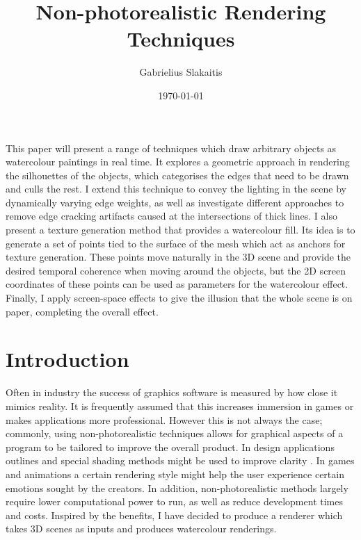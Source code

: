 \documentclass[a4paper, 12pt]{article}
\begin{document}
\title{Non-photorealistic Rendering Techniques}
\author{Gabrielius Slakaitis}
\date{\today}
\maketitle

\newpage


This paper will present a range of techniques which draw arbitrary objects as watercolour paintings in real time. It explores a geometric approach in rendering the silhouettes of the objects, which categorises the edges that need to be drawn and culls the rest. I extend this technique to convey the lighting in the scene by dynamically varying edge weights, as well as investigate different approaches to remove edge cracking artifacts caused at the intersections of thick lines. I also present a texture generation method that provides a watercolour fill. Its idea is to generate a set of points tied to the surface of the mesh which act as anchors for texture generation. These points move naturally in the 3D scene and provide the desired temporal coherence when moving around the objects, but the 2D screen coordinates of these points can be used as parameters for the watercolour effect. Finally, I apply screen-space effects to give the illusion that the whole scene is on paper, completing the overall effect.



\section{Introduction}

Often in industry the success of graphics software is measured by how close it mimics reality. It is frequently assumed that this increases immersion in games or makes applications more professional. However this is not always the case; commonly, using non-photorealistic techniques allows for graphical aspects of a program to be tailored to improve the overall product. In design applications outlines and special shading methods might be used to improve clarity \cite{Gooch1998}. In games and animations a certain rendering style might help the user experience certain emotions sought by the creators. In addition, non-photorealistic methods largely require lower computational power to run, as well as reduce development times and costs. Inspired by the benefits, I have decided to produce a renderer which takes 3D scenes as inputs and produces watercolour renderings.
\end{document}

